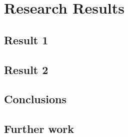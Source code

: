
\chapter{Research Results}

\section{Result 1}

\section{Result 2}

\section{Conclusions}

\section{Further work}  